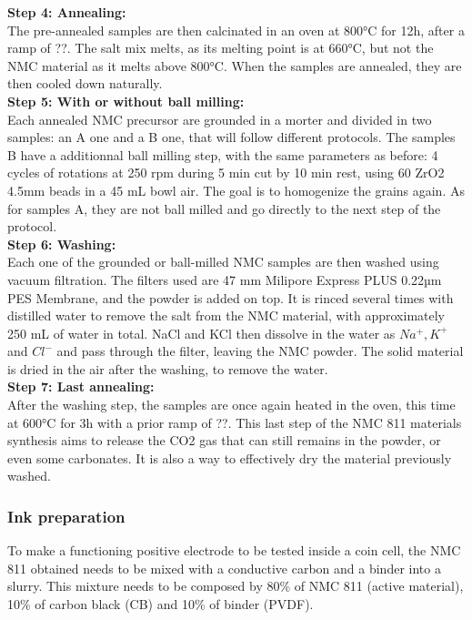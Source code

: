 \documentclass{article}
\begin{document}
{\textbf{Step 4: Annealing:}\\
The pre-annealed samples are then calcinated in an oven at 800°C for 12h, after a ramp of ??. The salt mix melts, as its melting point is at 660°C, but not the NMC material as it melts above 800°C. When the samples are annealed, they are then cooled down naturally.\\

\textbf{Step 5: With or without ball milling:}\\
Each annealed NMC precursor are grounded in a morter and divided in two samples: an  A one and a B one, that will follow different protocols. The samples B have a additionnal ball milling step, with the same parameters as before: 4 cycles of rotations at 250 rpm during 5 min cut by 10 min rest, using 60 ZrO2 4.5mm beads in a 45 mL bowl air. The goal is to homogenize the grains again. As for samples A, they are not ball milled and go directly to the next step of the protocol.\\

\textbf{Step 6: Washing:}\\
Each one of the grounded or ball-milled NMC samples are then washed using vacuum filtration. The filters used are 47 mm Milipore Express PLUS 0.22µm PES Membrane, and the powder is added on top. It is rinced several times with distilled water to remove the salt from the NMC material, with approximately 250 mL of water in total. NaCl and KCl then dissolve in the water as  $Na^+, K^+$ and $ Cl^-$ and pass through the filter, leaving the NMC powder. The solid material is dried in the air after the washing, to remove the water. \\

\textbf{Step 7: Last annealing:}\\
After the washing step, the samples are once again heated in the oven, this time at 600°C for 3h with a prior ramp of ??. This last step of the NMC 811 materials synthesis aims to release the CO2 gas that can still remains in the powder, or even some carbonates. It is also a way to effectively dry the material previously washed.\\

\subsubsection{Ink preparation}
To make a functioning positive electrode to be tested inside a coin cell, 
the NMC 811 obtained needs to be mixed with a conductive carbon and a binder into a slurry.
This mixture needs to be composed by 80\% of NMC 811 (active material), 10\% of carbon black (CB) and 10\% of binder (PVDF).\\

}
\end{document}
